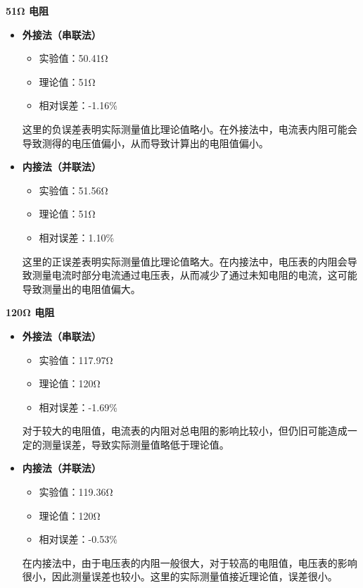 \documentclass[dvipsnames, svgnames,a4paper,11pt]{article}
\begin{document}
\begin{enumerate}
		\textbf{51Ω 电阻}
		
		\begin{itemize}
			\item \textbf{外接法（串联法）}
			\begin{itemize}
				\item 实验值：50.41Ω
				\item 理论值：51Ω
				\item 相对误差：-1.16\%
			\end{itemize}
			
			这里的负误差表明实际测量值比理论值略小。在外接法中，电流表内阻可能会导致测得的电压值偏小，从而导致计算出的电阻值偏小。
			
			\item \textbf{内接法（并联法）}
			\begin{itemize}
				\item 实验值：51.56Ω
				\item 理论值：51Ω
				\item 相对误差：1.10\%
			\end{itemize}
			
			这里的正误差表明实际测量值比理论值略大。在内接法中，电压表的内阻会导致测量电流时部分电流通过电压表，从而减少了通过未知电阻的电流，这可能导致测量出的电阻值偏大。
		\end{itemize}
		
		\textbf{120Ω 电阻}
		
		\begin{itemize}
			\item \textbf{外接法（串联法）}
			\begin{itemize}
				\item 实验值：117.97Ω
				\item 理论值：120Ω
				\item 相对误差：-1.69\%
			\end{itemize}
			
			对于较大的电阻值，电流表的内阻对总电阻的影响比较小，但仍旧可能造成一定的测量误差，导致实际测量值略低于理论值。
			
			\item \textbf{内接法（并联法）}
			\begin{itemize}
				\item 实验值：119.36Ω
				\item 理论值：120Ω
				\item 相对误差：-0.53\%
			\end{itemize}
			
			在内接法中，由于电压表的内阻一般很大，对于较高的电阻值，电压表的影响很小，因此测量误差也较小。这里的实际测量值接近理论值，误差很小。
		\end{itemize}
		
	\end{enumerate}
	
\end{document}
